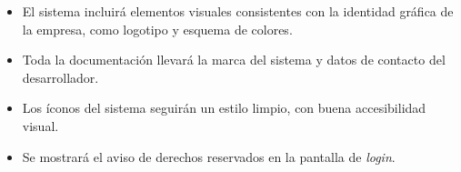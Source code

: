 \begin{itemize}
	\item El sistema incluirá elementos visuales consistentes con la identidad gráfica de la empresa, como logotipo y esquema de colores.
	\item Toda la documentación llevará la marca del sistema y datos de contacto del desarrollador.
	\item Los íconos del sistema seguirán un estilo limpio, con buena accesibilidad visual.
	\item Se mostrará el aviso de derechos reservados en la pantalla de \textit{login}.
\end{itemize}







